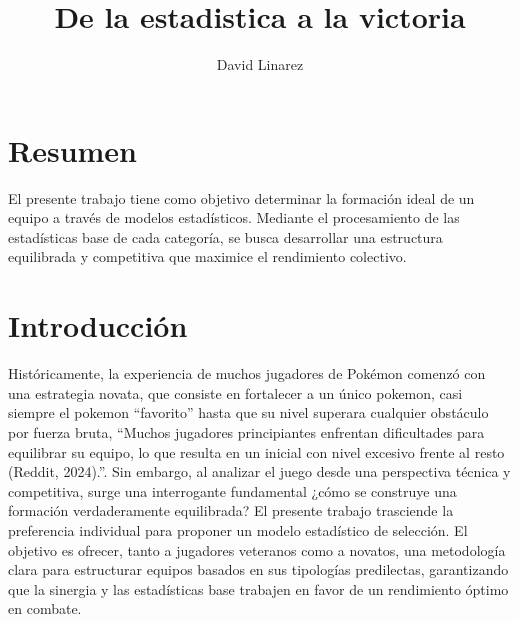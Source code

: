 \documentclass[oneside,11pt]{Latex/Classes/PhDthesisPSnPDF}
\title{De la estadistica a la victoria}
\author{David Linarez}
\begin{document}
\maketitle

\frontmatter


\setcounter{secnumdepth}{3}
\setcounter{tocdepth}{3}

\tableofcontents



\cleardoublepage

  \cleardoublepage       %
  \chapter*{Resumen}     %
  
  El presente trabajo tiene como objetivo determinar la formación ideal
de un equipo a través de modelos estadísticos. Mediante el procesamiento
de las estadísticas base de cada categoría, se busca desarrollar una
estructura equilibrada y competitiva que maximice el rendimiento
colectivo.             %
  
  \cleardoublepage

\mainmatter
\def\baselinestretch{1.5}

\chapter*{Introducción}

Históricamente, la experiencia de muchos jugadores de Pokémon comenzó
con una estrategia novata, que consiste en fortalecer a un único
pokemon, casi siempre el pokemon ``favorito'' hasta que su nivel
superara cualquier obstáculo por fuerza bruta, ``Muchos jugadores
principiantes enfrentan dificultades para equilibrar su equipo, lo que
resulta en un inicial con nivel excesivo frente al resto (Reddit,
2024).''. Sin embargo, al analizar el juego desde una perspectiva
técnica y competitiva, surge una interrogante fundamental ¿cómo se
construye una formación verdaderamente equilibrada? El presente trabajo
trasciende la preferencia individual para proponer un modelo estadístico
de selección. El objetivo es ofrecer, tanto a jugadores veteranos como a
novatos, una metodología clara para estructurar equipos basados en sus
tipologías predilectas, garantizando que la sinergia y las estadísticas
base trabajen en favor de un rendimiento óptimo en combate.
\end{document}
